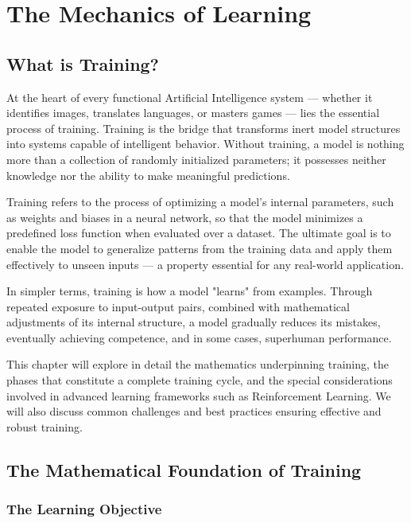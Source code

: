 \documentclass[openany]{book}
\begin{document}
\chapter{The Mechanics of Learning}

\section{What is Training?}

At the heart of every functional Artificial Intelligence system — whether it 
identifies images, translates languages, or masters games — lies the essential 
process of training. Training is the bridge that transforms inert model 
structures into systems capable of intelligent behavior. Without training, a 
model is nothing more than a collection of randomly initialized parameters; it 
possesses neither knowledge nor the ability to make meaningful predictions.

Training refers to the process of optimizing a model's internal parameters, such
as weights and biases in a neural network, so that the model minimizes a 
predefined loss function when evaluated over a dataset. The ultimate goal is to 
enable the model to generalize patterns from the training data and apply them 
effectively to unseen inputs — a property essential for any real-world 
application.

In simpler terms, training is how a model "learns" from examples. Through 
repeated exposure to input-output pairs, combined with mathematical adjustments 
of its internal structure, a model gradually reduces its mistakes, eventually 
achieving competence, and in some cases, superhuman performance.

This chapter will explore in detail the mathematics underpinning training, the 
phases that constitute a complete training cycle, and the special considerations 
involved in advanced learning frameworks such as Reinforcement Learning. We will
also discuss common challenges and best practices ensuring effective and robust 
training.

\section{The Mathematical Foundation of Training}

\subsection{The Learning Objective}
\end{document}
